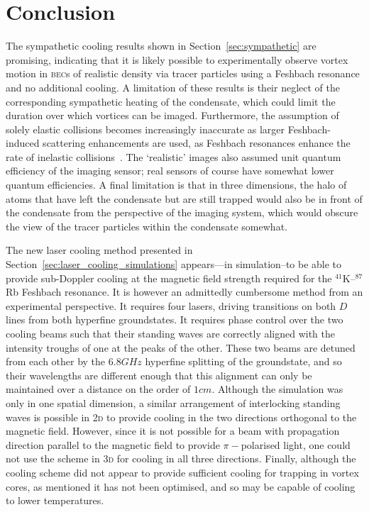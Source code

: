 \section{Conclusion}

The sympathetic cooling results shown in Section~\ref{sec:sympathetic} are promising, indicating that it is likely possible to experimentally observe vortex motion in \textsc{bec}s of realistic density via tracer particles using a Feshbach resonance and no additional cooling. A limitation of these results is their neglect of the corresponding sympathetic heating of the condensate, which could limit the duration over which vortices can be imaged. Furthermore, the assumption of solely elastic collisions becomes increasingly inaccurate as larger Feshbach-induced scattering enhancements are used, as Feshbach resonances enhance the rate of inelastic collisions~\cite{stenger_strongly_1999}. The `realistic' images also assumed unit quantum efficiency of the imaging sensor; real sensors of course have somewhat lower quantum efficiencies. A final limitation is that in three dimensions, the halo of atoms that have left the condensate but are still trapped would also be in front of the condensate from the perspective of the imaging system, which would obscure the view of the tracer particles within the condensate somewhat.

The new laser cooling method presented in Section~\ref{sec:laser_cooling_simulations} appears---in simulation--to be able to provide sub-Doppler cooling at the magnetic field strength required for the $^{41}$K--$^{87}$Rb Feshbach resonance. It is however an admittedly cumbersome method from an experimental perspective. It requires four lasers, driving transitions on both $D$ lines from both hyperfine groundstates. It requires phase control over the two cooling beams such that their standing waves are correctly aligned with the intensity troughs of one at the peaks of the other. These two beams are detuned from each other by the $6.8\unit{GHz}$ hyperfine splitting of the groundstate, and so their wavelengths are different enough that this alignment can only be maintained over a distance on the order of $1\unit{cm}$. Although the simulation was only in one spatial dimension, a similar arrangement of interlocking standing waves is possible in \textsc{2d} to provide cooling in the two directions orthogonal to the magnetic field. However, since it is not possible for a beam with propagation direction parallel to the magnetic field to provide $\pi-$polarised light, one could not use the scheme in \textsc{3d} for cooling in all three directions. Finally, although the cooling scheme did not appear to provide sufficient cooling for trapping in vortex cores, as mentioned it has not been optimised, and so may be capable of cooling to lower temperatures.